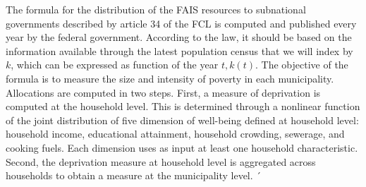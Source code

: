 \documentclass[dv_diss_main.tex]{subfiles}
\begin{document}
The formula for the distribution of the FAIS resources to subnational governments described by article 34 of the FCL is computed and published every year by the federal government. According to the law, it should be based on the information available through the latest population census that we will index by $k$, which can be expressed as function of the year $t, k(t)$. The objective of the formula is to measure the size and intensity of poverty in each municipality. Allocations are computed in two steps. First, a measure of deprivation is computed at the household level. This is determined through a nonlinear function of the joint distribution of five dimension of well-being defined at household level: household income, educational attainment, household crowding, sewerage, and cooking fuels. Each dimension uses as input at least one household characteristic. Second, the deprivation measure at household level is aggregated across households to obtain a measure at the municipality level. ´
\end{document}
